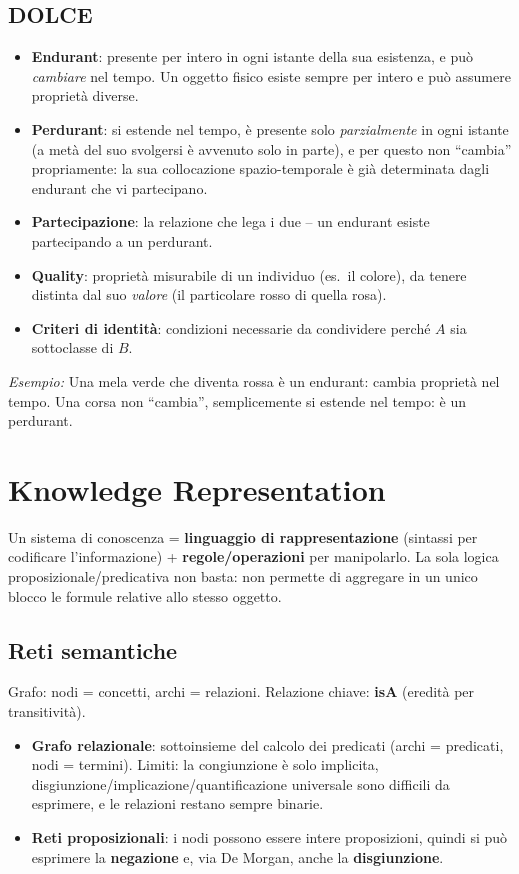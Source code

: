 \documentclass[11pt,a4paper]{article}
\newcommand{\es}[1]{\begin{esbox}\textit{Esempio:} #1\end{esbox}}
\begin{document}
\subsection*{DOLCE}
\begin{itemize}
  \item \textbf{Endurant}: presente per intero in ogni istante della sua esistenza, e pu\`o \emph{cambiare} nel tempo. Un oggetto fisico esiste sempre per intero e pu\`o assumere propriet\`a diverse.
  \item \textbf{Perdurant}: si estende nel tempo, \`e presente solo \emph{parzialmente} in ogni istante (a met\`a del suo svolgersi \`e avvenuto solo in parte), e per questo non ``cambia'' propriamente: la sua collocazione spazio-temporale \`e gi\`a determinata dagli endurant che vi partecipano.
  \item \textbf{Partecipazione}: la relazione che lega i due -- un endurant esiste partecipando a un perdurant.
  \item \textbf{Quality}: propriet\`a misurabile di un individuo (es.\ il colore), da tenere distinta dal suo \emph{valore} (il particolare rosso di quella rosa).
  \item \textbf{Criteri di identit\`a}: condizioni necessarie da condividere perch\'e $A$ sia sottoclasse di $B$.
\end{itemize}
\es{Una mela verde che diventa rossa \`e un endurant: cambia propriet\`a nel tempo. Una corsa non ``cambia'', semplicemente si estende nel tempo: \`e un perdurant.}

\section{Knowledge Representation}

Un sistema di conoscenza = \textbf{linguaggio di rappresentazione} (sintassi per codificare l'informazione) + \textbf{regole/operazioni} per manipolarlo. La sola logica proposizionale/predicativa non basta: non permette di aggregare in un unico blocco le formule relative allo stesso oggetto.

\subsection*{Reti semantiche}
Grafo: nodi = concetti, archi = relazioni. Relazione chiave: \textbf{isA} (eredit\`a per transitivit\`a).
\begin{itemize}
  \item \textbf{Grafo relazionale}: sottoinsieme del calcolo dei predicati (archi = predicati, nodi = termini). Limiti: la congiunzione \`e solo implicita, disgiunzione/implicazione/quantificazione universale sono difficili da esprimere, e le relazioni restano sempre binarie.
  \item \textbf{Reti proposizionali}: i nodi possono essere intere proposizioni, quindi si pu\`o esprimere la \textbf{negazione} e, via De Morgan, anche la \textbf{disgiunzione}.
\end{itemize}
\end{document}
